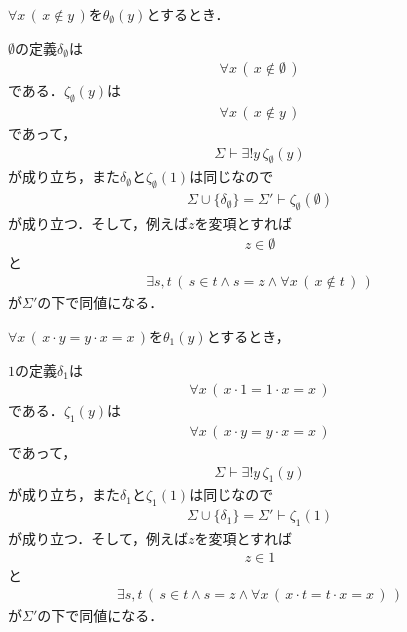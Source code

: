 \documentclass[a4j,10.5pt,oneside,openany]{jsbook}
\theoremstyle{mystyle}
\begin{document}
	\begin{screen}
		$\forall x\, (\, x \notin y\, )$を$\theta_{\emptyset}(y)$とするとき．
	\end{screen}
	
	$\emptyset$の定義$\delta_{\emptyset}$は
	\begin{align}
		\forall x\, (\, x \notin \emptyset\, )
	\end{align}
	である．$\zeta_{\emptyset}(y)$は
	\begin{align}
		\forall x\, (\, x \notin y\, )
	\end{align}
	であって，
	\begin{align}
		\Sigma \vdash \exists! y\, \zeta_{\emptyset}(y)
	\end{align}
	が成り立ち，また$\delta_{\emptyset}$と$\zeta_{\emptyset}(1)$は同じなので
	\begin{align}
		\Sigma \cup \{\delta_{\emptyset}\} = \Sigma' \vdash \zeta_{\emptyset}(\emptyset)
	\end{align}
	が成り立つ．そして，例えば$z$を変項とすれば
	\begin{align}
		z \in \emptyset
	\end{align}
	と
	\begin{align}
		\exists s,t\, \left(\, s \in t \wedge s = z \wedge \forall x\, (\, x \notin t\, )\, \right)
	\end{align}
	が$\Sigma'$の下で同値になる．
	
	\begin{screen}
		$\forall x\, (\, x \cdot y = y \cdot x = x\, )$を$\theta_{1}(y)$とするとき，
	\end{screen}
	
	$1$の定義$\delta_{1}$は
	\begin{align}
		\forall x\, (\, x \cdot 1 = 1 \cdot x = x\, )
	\end{align}
	である．$\zeta_{1}(y)$は
	\begin{align}
		\forall x\, (\, x \cdot y = y \cdot x = x\, )
	\end{align}
	であって，
	\begin{align}
		\Sigma \vdash \exists! y\, \zeta_{1}(y)
	\end{align}
	が成り立ち，また$\delta_{1}$と$\zeta_{1}(1)$は同じなので
	\begin{align}
		\Sigma \cup \{\delta_{1}\} = \Sigma' \vdash \zeta_{1}(1)
	\end{align}
	が成り立つ．そして，例えば$z$を変項とすれば
	\begin{align}
		z \in 1
	\end{align}
	と
	\begin{align}
		\exists s,t\, \left(\, s \in t \wedge s = z \wedge \forall x\, (\, x \cdot t = t \cdot x = x\, )\, \right)
	\end{align}
	が$\Sigma'$の下で同値になる．
	
\end{document}
